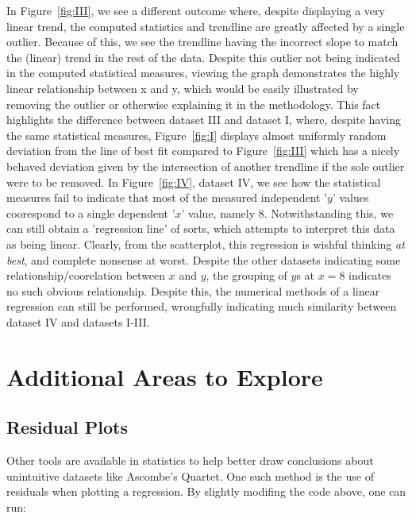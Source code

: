 \documentclass[11pt,a4paper]{article}
\begin{document}
In Figure~\ref{fig:III}, we see a different outcome where, despite displaying a very linear trend, the computed statistics and trendline are greatly affected by a single outlier. Because of this, we see the trendline having the incorrect slope to match the (linear) trend in the rest of the data. Despite this outlier not being indicated in the computed statistical measures, viewing the graph demonstrates the highly linear relationship between x and y, which would be easily illustrated by removing the outlier or otherwise explaining it in the methodology. This fact highlights the difference between dataset III and dataset I, where, despite having the same statistical measures, Figure~\ref{fig:I} displays almost uniformly random deviation from the line of best fit compared to Figure~\ref{fig:III} which has a nicely behaved deviation given by the intersection of another trendline if the sole outlier were to be removed.
In Figure~\ref{fig:IV}, dataset IV, we see how the statistical measures fail to indicate that most of the measured independent '$y$' values coorespond to a single dependent '$x$' value, namely $8$. Notwithstanding this, we can still obtain a 'regression line' of sorts, which attempts to interpret this data as being linear. Clearly, from the scatterplot, this regression is wishful thinking \textit{at best}, and complete nonsense at worst. Despite the other datasets indicating some relationship/coorelation between $x$ and $y$, the grouping of $y$s at $x=8$ indicates no such  obvious relationship. Despite this, the numerical methods of a linear regression can still be performed, wrongfully indicating much similarity between dataset IV and datasets I-III.

\section{Additional Areas to Explore}
\subsection{Residual Plots}

Other tools are available in statistics to help better draw conclusions about unintuitive datasets like Ascombe's Quartet. One such method is the use of residuals when plotting a regression. By slightly modifing the code above, one can run:
\end{document}
